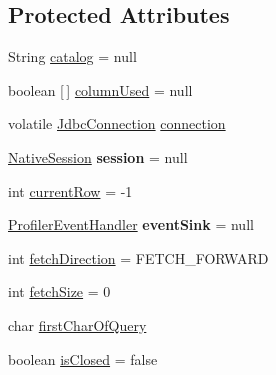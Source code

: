 \subsection*{Protected Attributes}
\begin{DoxyCompactItemize}
\item 
String \mbox{\hyperlink{classcom_1_1mysql_1_1cj_1_1jdbc_1_1result_1_1_result_set_impl_a05837dfc0f57d6e0673eec5b363f12dc}{catalog}} = null
\item 
boolean \mbox{[}$\,$\mbox{]} \mbox{\hyperlink{classcom_1_1mysql_1_1cj_1_1jdbc_1_1result_1_1_result_set_impl_a8e99c3b2c3b7b7c97aec4f77d665fa5b}{column\+Used}} = null
\item 
volatile \mbox{\hyperlink{interfacecom_1_1mysql_1_1cj_1_1jdbc_1_1_jdbc_connection}{Jdbc\+Connection}} \mbox{\hyperlink{classcom_1_1mysql_1_1cj_1_1jdbc_1_1result_1_1_result_set_impl_aa177ec5c7229b07c51ab4d114d284c94}{connection}}
\item 
\mbox{\label{classcom_1_1mysql_1_1cj_1_1jdbc_1_1result_1_1_result_set_impl_a208c3fe39186b5c806f01c2122589bfb}} 
\mbox{\hyperlink{classcom_1_1mysql_1_1cj_1_1_native_session}{Native\+Session}} {\bfseries session} = null
\item 
int \mbox{\hyperlink{classcom_1_1mysql_1_1cj_1_1jdbc_1_1result_1_1_result_set_impl_ac695da410eeee2422b717bb50e8a3518}{current\+Row}} = -\/1
\item 
\mbox{\label{classcom_1_1mysql_1_1cj_1_1jdbc_1_1result_1_1_result_set_impl_a142f9bf4978b7c29430315650f472c27}} 
\mbox{\hyperlink{interfacecom_1_1mysql_1_1cj_1_1log_1_1_profiler_event_handler}{Profiler\+Event\+Handler}} {\bfseries event\+Sink} = null
\item 
int \mbox{\hyperlink{classcom_1_1mysql_1_1cj_1_1jdbc_1_1result_1_1_result_set_impl_a0bff4926d818afda3b1a31f68816f15a}{fetch\+Direction}} = F\+E\+T\+C\+H\+\_\+\+F\+O\+R\+W\+A\+RD
\item 
int \mbox{\hyperlink{classcom_1_1mysql_1_1cj_1_1jdbc_1_1result_1_1_result_set_impl_a1346462740391fb74871f1be4f9fde2b}{fetch\+Size}} = 0
\item 
char \mbox{\hyperlink{classcom_1_1mysql_1_1cj_1_1jdbc_1_1result_1_1_result_set_impl_a7c208697752d60ed576d9975f66a12a8}{first\+Char\+Of\+Query}}
\item 
boolean \mbox{\hyperlink{classcom_1_1mysql_1_1cj_1_1jdbc_1_1result_1_1_result_set_impl_a235f24cf3be20c9d1dea2f9c75a20a21}{is\+Closed}} = false

\end{DoxyCompactItemize}
